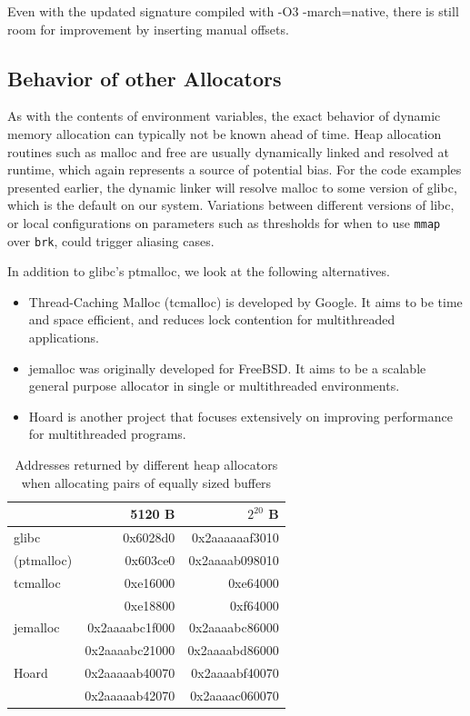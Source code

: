 \documentclass[a4paper,10pt,twocolumn,twoside]{article}
\begin{document}
{Even with the updated signature compiled with -O3 -march=native, there is still room for improvement by inserting manual offsets.


\subsection{Behavior of other Allocators}
As with the contents of environment variables, the exact behavior of dynamic memory allocation can typically not be known ahead of time.
Heap allocation routines such as malloc and free are usually dynamically linked and resolved at runtime, which again represents a source of potential bias.
For the code examples presented earlier, the dynamic linker will resolve malloc to some version of glibc, which is the default on our system.
Variations between different versions of libc, or local configurations on parameters such as thresholds for when to use \texttt{mmap} over \texttt{brk}, could trigger aliasing cases.

In addition to glibc's ptmalloc, we look at the following alternatives.
\begin{itemize}
 \item Thread-Caching Malloc (tcmalloc) is developed by Google. It aims to be time and space efficient, and reduces lock contention for multithreaded applications. \cite{TCMalloc}
 \item jemalloc was originally developed for FreeBSD. It aims to be a scalable general purpose allocator in single or multithreaded environments. \cite{JEMalloc}
 \item Hoard is another project that focuses extensively on improving performance for multithreaded programs. \cite{Berger:2000:Hoard}
\end{itemize}

\begin{table}[t]
  \caption{Addresses returned by different heap allocators when allocating pairs of equally sized buffers}
  \label{tab:mallocompare}
  \centering
  \small
  \begin{tabular}{l r r}
    \toprule
                      & 5120 B          & $2^{20}$ B \\
    \midrule
    glibc             & 0x6028d0        & 0x2aaaaaaf3010 \\
    (ptmalloc)        & 0x603ce0        & 0x2aaaab098010 \\
    \midrule
    tcmalloc          & 0xe16000        & 0xe64000 \\
                      & 0xe18800        & 0xf64000 \\
    \midrule
    jemalloc          & 0x2aaaabc1f000  & 0x2aaaabc86000 \\
                      & 0x2aaaabc21000  & 0x2aaaabd86000 \\
    \midrule
    Hoard             & 0x2aaaaab40070  & 0x2aaaabf40070 \\
                      & 0x2aaaaab42070  & 0x2aaaac060070 \\
    \bottomrule
  \end{tabular}
\end{table}

}
\end{document}
